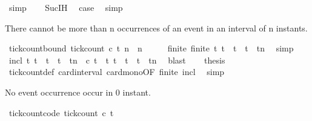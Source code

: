 \begin{isabellebody}
\ simp\isanewline
\ \ \isamarkupfalse%
\ Suc{\isachardot}IH\ \isamarkupfalse%
\ {\isacharquery}case\ \isamarkupfalse%
\ simp\isanewline
{}\isamarkupfalse%
%
\endisatagproof
{\isafoldproof}%
%
\isadelimproof
%
\endisadelimproof
%
\begin{isamarkuptext}%
There cannot be more than n occurrences of an event in an interval of n instants.%
\end{isamarkuptext}\isamarkuptrue%
\isamarkupfalse%
\ tick{\isacharunderscore}count{\isacharunderscore}bound{\isacharcolon}\ {\isacartoucheopen}tick{\isacharunderscore}count\ c\ t\ n\ {\isasymle}\ n{\isacartoucheclose}\isanewline
%
\isadelimproof
%
\endisadelimproof
%
\isatagproof
{}\isamarkupfalse%
\ {\isacharminus}\isanewline
\ \ \isamarkupfalse%
\ finite{\isacharcolon}\ {\isacartoucheopen}finite\ {\isacharbraceleft}t{\isachardot}\ t\ {\isasymle}\ t\ {\isasymand}\ t\ {\isacharless}\ tn{\isacharbraceright}{\isacartoucheclose}\ \isamarkupfalse%
\ simp\isanewline
\ \ \isamarkupfalse%
\ incl{\isacharcolon}\ {\isacartoucheopen}{\isacharbraceleft}t{\isachardot}\ t\ {\isasymle}\ t\ {\isasymand}\ t\ {\isacharless}\ tn\ {\isasymand}\ c\ t{\isacharbraceright}\ {\isasymsubseteq}\ {\isacharbraceleft}t{\isachardot}\ t\ {\isasymle}\ t\ {\isasymand}\ t\ {\isacharless}\ tn{\isacharbraceright}{\isacartoucheclose}\ \isamarkupfalse%
\ blast\isanewline
\ \ \isamarkupfalse%
\ {\isacharquery}thesis\ \isamarkupfalse%
\ tick{\isacharunderscore}count{\isacharunderscore}def\ card{\isacharunderscore}interval\ card{\isacharunderscore}mono{\isacharbrackleft}OF\ finite\ incl{\isacharbrackright}\ \isamarkupfalse%
\ simp\isanewline
{}\isamarkupfalse%
%
\endisatagproof
{\isafoldproof}%
%
\isadelimproof
%
\endisadelimproof
%
\begin{isamarkuptext}%
No event occurrence occur in 0 instant.%
\end{isamarkuptext}\isamarkuptrue%
\isamarkupfalse%
\ tick{\isacharunderscore}count{\isacharunderscore}{}{\isacharbrackleft}code{\isacharbrackright}{\isacharcolon}\ {\isacartoucheopen}tick{\isacharunderscore}count\ c\ t\ {}\ {\isacharequal}\ {}{\isacartoucheclose}\isanewline

\end{isabellebody}
